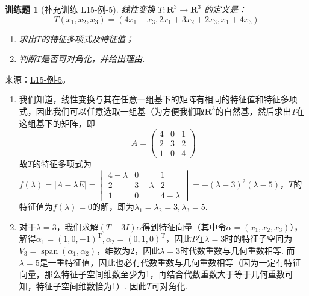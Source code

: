 \documentclass[UTF8,12pt,a4paper,fontset=fandol]{ctexart}
\newtheorem{exercise}{训练题}[section]
\begin{document}
\begin{exercise}[补充训练 L15-例-5]\label{prob:L15-例-5}
线性变换 $T : \mathbf{R}^3 \to \mathbf{R}^3$ 的定义是：
    \[T(x_1,x_2,x_3)=(4x_1+x_3,2x_1+3x_2+2x_3,x_1+4x_3)\]
    \begin{enumerate}
        \item 求出$T$的特征多项式及特征值；

        \item 判断$T$是否可对角化，并给出理由.
    \end{enumerate}
\end{exercise}
\noindent 来源：\href{https://github.com/yhwu-is/Linear-Algebra-Left-Undone/blob/new/%E8%AE%B2%E4%B9%89/%E4%B8%93%E9%A2%98/15%20%E7%9B%B8%E4%BC%BC%E6%A0%87%E5%87%86%E5%BD%A2%EF%BC%9A%E5%A4%8D%E6%95%B0%E5%9F%9F%E4%B8%8A%E7%9A%84%E5%B0%9D%E8%AF%95%E4%B8%8E%E7%90%86%E8%AE%BA.tex}{L15-例-5}。
\begin{solve}
\begin{enumerate}
        \item 我们知道，线性变换与其在任意一组基下的矩阵有相同的特征值和特征多项式，因此我们可以任意选取一组基（为方便我们取$\mathbf{R}^3$的自然基，然后求出$T$在这组基下的矩阵，即
              \[A=\begin{pmatrix}
                      4 & 0 & 1 \\
                      2 & 3 & 2 \\
                      1 & 0 & 4
                  \end{pmatrix}\]
              故$T$的特征多项式为$f(\lambda)=|A-\lambda E|=\begin{vmatrix}
                      4-\lambda & 0         & 1         \\
                      2         & 3-\lambda & 2         \\
                      1         & 0         & 4-\lambda
                  \end{vmatrix}=-(\lambda-3)^2(\lambda-5)$，$T$的特征值为$f(\lambda)=0$的解，即为$\lambda_1=\lambda_2=3,\lambda_3=5$.

        \item 对于$\lambda=3$，我们求解$(T-3I)\alpha$得到特征向量（其中令$\alpha=(x_1,x_2,x_3)$），解得$\alpha_1=(1,0,-1)^\mathrm{T},\alpha_2=(0,1,0)^\mathrm{T}$，因此$T$在$\lambda=3$时的特征子空间为$V_3=\operatorname{span}(\alpha_1,\alpha_2)$，维数为2，因此$\lambda=3$时代数重数与几何重数相等. 而$\lambda=5$是一重特征值，因此也必有代数重数与几何重数相等（因为一定有特征向量，那么特征子空间维数至少为1，再结合代数重数大于等于几何重数可知，特征子空间维数恰为1）. 因此$T$可对角化.
    \end{enumerate}
\end{solve}
\end{document}

